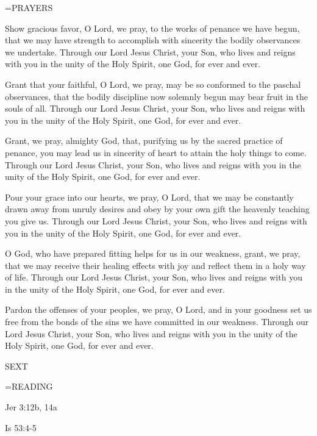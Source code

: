 \hangindent=\parindent \small PRAYERS
\begin{description}[labelindent=\parindent, noitemsep, leftmargin=*]
\item [Friday after Ash Wednesday:] 	Show gracious favor, O Lord, we pray, to the works of penance we have begun, that we may have strength to accomplish with sincerity the bodily observances we undertake. Through our Lord Jesus Christ, your Son, who lives and reigns with you in the unity of the Holy Spirit, one God, for ever and ever.
\item [Week 1:] 	Grant that your faithful, O Lord, we pray, may be so conformed to the paschal observances, that the bodily discipline now solemnly begun may bear fruit in the souls of all. Through our Lord Jesus Christ, your Son, who lives and reigns with you in the unity of the Holy Spirit, one God, for ever and ever.
\item [Week 2:] 	Grant, we pray, almighty God, that, purifying us by the sacred practice of penance, you may lead us in sincerity of heart to attain the holy things to come. Through our Lord Jesus Christ, your Son, who lives and reigns with you in the unity of the Holy Spirit, one God, for ever and ever.
\item [Week 3:] 	Pour your grace into our hearts, we pray, O Lord, that we may be constantly drawn away from unruly desires and obey by your own gift the heavenly teaching you give us. Through our Lord Jesus Christ, your Son, who lives and reigns with you in the unity of the Holy Spirit, one God, for ever and ever.
\item [Week 4:] 	O God, who have prepared fitting helps for us in our weakness, grant, we pray, that we may receive their healing effects with joy and reflect them in a holy way of life. Through our Lord Jesus Christ, your Son, who lives and reigns with you in the unity of the Holy Spirit, one God, for ever and ever.
\item [Week 5:] 	Pardon the offenses of your peoples, we pray, O Lord, and in your goodness set us free from the bonds of the sins we have committed in our weakness. Through our Lord Jesus Christ, your Son, who lives and reigns with you in the unity of the Holy Spirit, one God, for ever and ever.
\end{description}

\begin{flushleft}\normalsize SEXT\\\end{flushleft}

\hangindent=\parindent \small READING
\begin{description}[labelindent=\parindent, leftmargin=*]
\item [Friday after Ash Wednesday \& Weeks 1-4:]     Jer 3:12b, 14a \textbf{    }
\item [Week 5:]     Is 53:4-5 \textbf{    }
\end{description}


